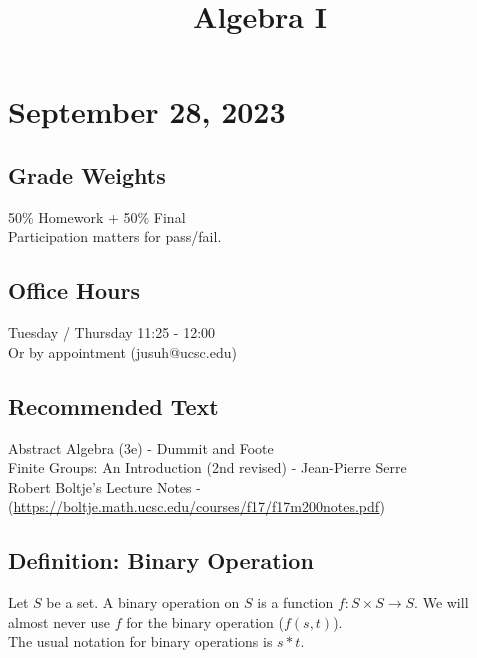 \documentclass[11pt]{article}
\date{}
\title{Algebra I}
\newcommand{\0}{\emptyset}
\begin{document}
\maketitle
\section*{September 28, 2023}
\label{sec:org48323c2}
\subsection*{Grade Weights}
\label{sec:orgbd4c4f2}
50\% Homework + 50\% Final\\[0pt]
Participation matters for pass/fail.\\[0pt]
\subsection*{Office Hours}
\label{sec:org0132ea7}
Tuesday / Thursday 11:25 - 12:00\\[0pt]
Or by appointment (jusuh@ucsc.edu)\\[0pt]
\subsection*{Recommended Text}
\label{sec:orgb037464}
Abstract Algebra (3e) - Dummit and Foote\\[0pt]
Finite Groups: An Introduction (2nd revised) - Jean-Pierre Serre\\[0pt]
Robert Boltje's Lecture Notes - (\url{https://boltje.math.ucsc.edu/courses/f17/f17m200notes.pdf})\\[0pt]
\subsection*{Definition: Binary Operation}
\label{sec:org6a25960}
Let \(S\) be a set. A binary operation on \(S\) is a function \(f:S\times S\to S\). We will almost never use \(f\) for the binary operation (\(f(s,t)\)).\\[0pt]
The usual notation for binary operations is \(s*t\).\\[0pt]
\end{document}
